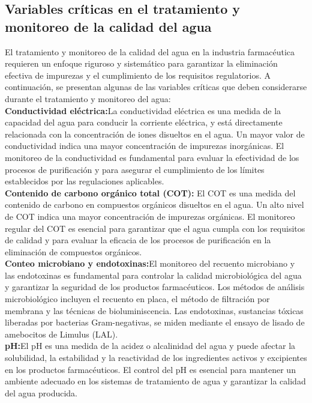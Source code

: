 \subsection{Variables críticas en el tratamiento y monitoreo de la calidad del agua}

El tratamiento y monitoreo de la calidad del agua en la industria farmacéutica requieren un enfoque riguroso y sistemático para garantizar la eliminación efectiva de impurezas y el cumplimiento de los requisitos regulatorios. A continuación, se presentan algunas de las variables críticas que deben considerarse durante el tratamiento y monitoreo del agua:\\
\textbf{Conductividad eléctrica:}La conductividad eléctrica es una medida de la capacidad del agua para conducir la corriente eléctrica, y está directamente relacionada con la concentración de iones disueltos en el agua. Un mayor valor de conductividad indica una mayor concentración de impurezas inorgánicas. El monitoreo de la conductividad es fundamental para evaluar la efectividad de los procesos de purificación y para asegurar el cumplimiento de los límites establecidos por las regulaciones aplicables.\\

\textbf{Contenido de carbono orgánico total (COT):} El COT es una medida del contenido de carbono en compuestos orgánicos disueltos en el agua. Un alto nivel de COT indica una mayor concentración de impurezas orgánicas. El monitoreo regular del COT es esencial para garantizar que el agua cumpla con los requisitos de calidad y para evaluar la eficacia de los procesos de purificación en la eliminación de compuestos orgánicos.\\

\textbf{Conteo microbiano y endotoxinas:}El monitoreo del recuento microbiano y las endotoxinas es fundamental para controlar la calidad microbiológica del agua y garantizar la seguridad de los productos farmacéuticos. Los métodos de análisis microbiológico incluyen el recuento en placa, el método de filtración por membrana y las técnicas de bioluminiscencia. Las endotoxinas, sustancias tóxicas liberadas por bacterias Gram-negativas, se miden mediante el ensayo de lisado de amebocitos de Limulus (LAL).\\

\textbf{pH:}El pH es una medida de la acidez o alcalinidad del agua y puede afectar la solubilidad, la estabilidad y la reactividad de los ingredientes activos y excipientes en los productos farmacéuticos. El control del pH es esencial para mantener un ambiente adecuado en los sistemas de tratamiento de agua y garantizar la calidad del agua producida.\\

